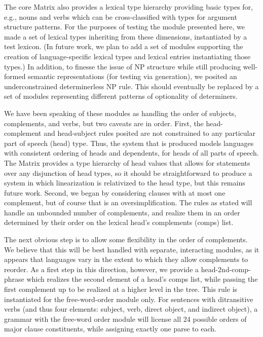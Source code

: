 The core Matrix also provides a lexical type hierarchy providing basic
types for, e.g., nouns and verbs which can be
cross-classified with types for argument structure patterns.
For the purposes of testing the module presented here, we made a set
of lexical types inheriting from these dimensions, instantiated by a
test lexicon.  (In future work, we plan to add a set of modules
supporting the creation of language-specific lexical types and lexical
entries instantiating those types.)  In addition, to finesse the issue
of NP structure while still producing well-formed semantic
representations (for testing via generation), we posited an
underconstrained determinerless NP rule.  This should eventually be
replaced by a set of modules representing different patterns of
optionality of determiners.

We have been speaking of these modules as handling the order of
subjects, complements, and verbs, but two caveats are in order.  First,
the head-complement and head-subject rules posited are not constrained
to any particular part of speech ({\sc head}) type. Thus, the system that is
produced models languages with consistent ordering of heads and
dependents, for heads of all parts of speech.  The Matrix provides a
type hierarchy of {\sc head} values that allows for statements over any
disjunction of head types, so it should be straightforward to produce
a system in which linearization is relativized to the head type, but
this remains future work.  Second, we began by considering clauses
with at most one complement, but of course that is an
oversimplification.  The rules as stated will handle an unbounded
number of complements, and realize them in an order determined by
their order on the lexical head's complements ({\sc comps}) list.

The next obvious step is to allow some flexibility in the order of
complements.  We believe that this will be best handled with separate,
interacting modules, as it appears that languages vary in the
extent to which they allow complements to reorder.
As a first step in this direction,
however, we provide a head-2nd-comp-phrase which realizes the
second element of a head's {\sc comps} list, while passing the first
complement up to be realized at a higher level in the tree.  This rule
is instantiated for the free-word-order module only.  For sentences
with ditransitive verbs (and thus four elements: subject, verb, direct
object, and indirect object), a grammar with the free-word order
module will license all 24 possible orders of major clause
constituents, while assigning exactly one parse to each.

